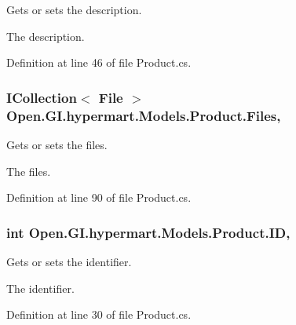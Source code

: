 Gets or sets the description. 

The description. 

Definition at line 46 of file Product.\+cs.

\hypertarget{class_open_1_1_g_i_1_1hypermart_1_1_models_1_1_product_a8632e80d5f05c8818c289b3924137c13}{}
\subsubsection[{Files}]{\setlength{\rightskip}{0pt plus 5cm}I\+Collection$<$ {\bf File} $>$ Open.\+G\+I.\+hypermart.\+Models.\+Product.\+Files\hspace{0.3cm}{\ttfamily [get]}, {\ttfamily [set]}}\label{class_open_1_1_g_i_1_1hypermart_1_1_models_1_1_product_a8632e80d5f05c8818c289b3924137c13}


Gets or sets the files. 

The files. 

Definition at line 90 of file Product.\+cs.

\hypertarget{class_open_1_1_g_i_1_1hypermart_1_1_models_1_1_product_a4fedd3f62a9c36939c6e45ea2e8cd011}{}
\subsubsection[{I\+D}]{\setlength{\rightskip}{0pt plus 5cm}int Open.\+G\+I.\+hypermart.\+Models.\+Product.\+I\+D\hspace{0.3cm}{\ttfamily [get]}, {\ttfamily [set]}}\label{class_open_1_1_g_i_1_1hypermart_1_1_models_1_1_product_a4fedd3f62a9c36939c6e45ea2e8cd011}


Gets or sets the identifier. 

The identifier. 

Definition at line 30 of file Product.\+cs.

\hypertarget{class_open_1_1_g_i_1_1hypermart_1_1_models_1_1_product_a646bc5e183ba8d87c06d290398e6bee6}{}
